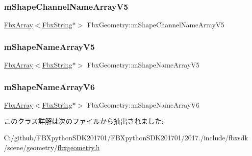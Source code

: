 \mbox{\label{class_fbx_geometry_a8752a5800b261d678592dc7a81dad4b0}} 
\subsubsection{\texorpdfstring{m\+Shape\+Channel\+Name\+Array\+V5}{mShapeChannelNameArrayV5}}
{\footnotesize\ttfamily \hyperlink{class_fbx_array}{Fbx\+Array}$<$\hyperlink{class_fbx_string}{Fbx\+String}$\ast$$>$ Fbx\+Geometry\+::m\+Shape\+Channel\+Name\+Array\+V5\hspace{0.3cm}{\ttfamily [protected]}}

\mbox{\label{class_fbx_geometry_a2a38009f990f6dfa9ca81ee2b24b024b}} 
\subsubsection{\texorpdfstring{m\+Shape\+Name\+Array\+V5}{mShapeNameArrayV5}}
{\footnotesize\ttfamily \hyperlink{class_fbx_array}{Fbx\+Array}$<$\hyperlink{class_fbx_string}{Fbx\+String}$\ast$$>$ Fbx\+Geometry\+::m\+Shape\+Name\+Array\+V5\hspace{0.3cm}{\ttfamily [protected]}}

\mbox{\label{class_fbx_geometry_a7f09646b7a716f58932d9be9c4a34486}} 
\subsubsection{\texorpdfstring{m\+Shape\+Name\+Array\+V6}{mShapeNameArrayV6}}
{\footnotesize\ttfamily \hyperlink{class_fbx_array}{Fbx\+Array}$<$\hyperlink{class_fbx_string}{Fbx\+String}$\ast$$>$ Fbx\+Geometry\+::m\+Shape\+Name\+Array\+V6\hspace{0.3cm}{\ttfamily [protected]}}



このクラス詳解は次のファイルから抽出されました\+:\begin{DoxyCompactItemize}
\item 
C\+:/github/\+F\+B\+Xpython\+S\+D\+K201701/\+F\+B\+Xpython\+S\+D\+K201701/2017./include/fbxsdk/scene/geometry/\hyperlink{fbxgeometry_8h}{fbxgeometry.\+h}\end{DoxyCompactItemize}
